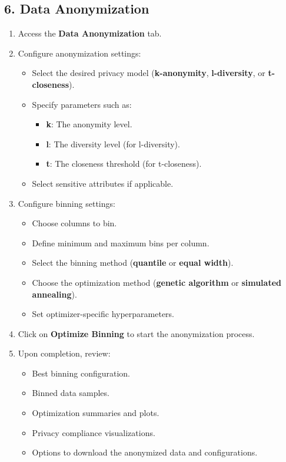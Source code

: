 \documentclass[12pt,a4paper]{article}
\begin{document}
\subsection{6. Data Anonymization}
\label{sec:data_anonymization}
\begin{enumerate}
    \item Access the \textbf{Data Anonymization} tab.
    \item Configure anonymization settings:
    \begin{itemize}
        \item Select the desired privacy model (\textbf{k-anonymity}, \textbf{l-diversity}, or \textbf{t-closeness}).
        \item Specify parameters such as:
        \begin{itemize}
            \item \textbf{k}: The anonymity level.
            \item \textbf{l}: The diversity level (for l-diversity).
            \item \textbf{t}: The closeness threshold (for t-closeness).
        \end{itemize}
        \item Select sensitive attributes if applicable.
    \end{itemize}
    \item Configure binning settings:
    \begin{itemize}
        \item Choose columns to bin.
        \item Define minimum and maximum bins per column.
        \item Select the binning method (\textbf{quantile} or \textbf{equal width}).
        \item Choose the optimization method (\textbf{genetic algorithm} or \textbf{simulated annealing}).
        \item Set optimizer-specific hyperparameters.
    \end{itemize}
    \item Click on \textbf{Optimize Binning} to start the anonymization process.
    \item Upon completion, review:
    \begin{itemize}
        \item Best binning configuration.
        \item Binned data samples.
        \item Optimization summaries and plots.
        \item Privacy compliance visualizations.
        \item Options to download the anonymized data and configurations.
    \end{itemize}
\end{enumerate}
\end{document}
